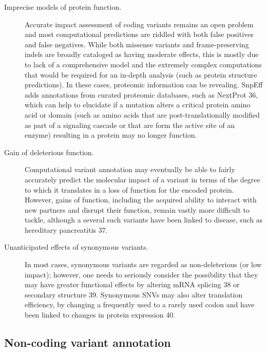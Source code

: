 	\begin{description}
	
	\item[Imprecise models of protein function.] Accurate impact assessment of coding variants remains an open problem and most computational predictions are riddled with both false positives and false negatives. While both missense variants and frame-preserving indels are broadly cataloged as having moderate effects, this is mostly due to lack of a comprehensive model and the extremely complex computations that would be required for an in-depth analysis (such as protein structure predictions). In these cases, proteomic information can be revealing. SnpEff adds annotations from curated proteomic databases, such as NextProt 36, which can help to elucidate if a mutation alters a critical protein amino acid or domain (such as amino acids that are post-translationally modified as part of a signaling cascade or that are form the active site of an enzyme) resulting in a protein may no longer function.
	
	\item[Gain of deleterious function.] Computational variant annotation may eventually be able to fairly accurately predict the molecular impact of a variant in terms of the degree to which it translates in a loss of function for the encoded protein. However, gains of function, including the acquired ability to interact with new partners and disrupt their function, remain vastly more difficult to tackle, although a several such variants have been linked to disease, such as hereditary pancreatitis 37.
	
	\item[Unanticipated effects of synonymous variants.] In most cases, synonymous variants are regarded as non-deleterious (or low impact); however, one needs to seriously consider the possibility that they may have greater functional effects by altering mRNA splicing 38 or secondary structure 39. Synonymous SNVs may also alter translation efficiency, by changing a frequently used to a rarely used codon and have been linked to changes in protein expression 40.
	
	\end{description}

\subsection{Non-coding variant annotation}


